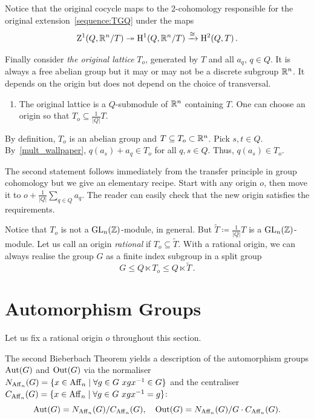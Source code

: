     Notice that the original cocycle maps to
    the 2-cohomology responsible for the original extension~\eqref{sequence:TGQ} under the maps
    \[ \mathrm{Z}^1 (Q,{\mathbb R}^n/T) \twoheadrightarrow \mathrm{H}^1 (Q,{\mathbb R}^n/T) \xrightarrow{\cong} \mathrm{H}^2 (Q,T) \, . \]

    Finally consider {\em the original lattice} $T_o$, generated by $T$ and all $a_q$, $q\in Q$.
    It is always a free abelian group but it may or may not be a discrete subgroup ${\mathbb R}^n$. It depends on the origin but does not depend on the choice of transversal.
  \begin{enumerate}[resume, label=\textnormal{(\Roman*)}]
  \item The original lattice is a $Q$-submodule of ${\mathbb R}^n$ containing $T$. One can choose an origin so that
    $T_o \subseteq \frac{1}{|Q|} T$.
  \end{enumerate}
  \begin{just}
    By definition, $T_o$ is an abelian group and $T\subseteq T_o \subset {\mathbb R}^n$. Pick $s,t\in Q$. By~\eqref{mult_wallpaper},
    $q(a_s)+a_q \in T_o$ for all $q,s\in Q$. Thus, $q(a_s) \in T_o$.

    The second statement follows immediately from the transfer principle in group cohomology but we give an elementary recipe.
    Start with any origin $o$, then move it to $o+ \frac{1}{|Q|} \sum_{q\in Q} a_q$. The reader can easily check that the new origin satisfies
    the requirements.
\end{just}

Notice that $T_o$ is not a $\operatorname{GL}_n({\mathbb Z})$-module, in general. But $\widetilde{T}\coloneqq \frac1{|Q|}T$ is a $\operatorname{GL}_n({\mathbb Z})$-module.
  Let us call an origin {\em rational} if $T_o \subseteq \widetilde{T}$. With a rational origin, we can always realise the group $G$ as a finite index subgroup in a split group
  \[ G \leq Q \ltimes T_o \leq Q \ltimes \widetilde{T} \, . \]

  
\section{Automorphism Groups}

Let us fix a rational origin $o$ throughout this section.

The second Bieberbach Theorem yields a description of the automorphism groups $\operatorname{Aut} (G)$ and $\operatorname{Out} (G)$ via
the normaliser $N_{\operatorname{Aff}_n} (G) = \{ x \in \operatorname{Aff}_n \mid \forall g\in G \ xgx^{-1}\in G \}$ and
the centraliser $C_{\operatorname{Aff}_n} (G) = \{ x \in \operatorname{Aff}_n \mid \forall g\in G \ xgx^{-1}=g \}$:
\begin{equation} \label{formula:AUT1}
  \operatorname{Aut} (G)  = N_{\operatorname{Aff}_n} (G) /C_{\operatorname{Aff}_n} (G), \quad
  \operatorname{Out} (G)  = N_{\operatorname{Aff}_n} (G) /G \cdot C_{\operatorname{Aff}_n} (G).
\end{equation}  

